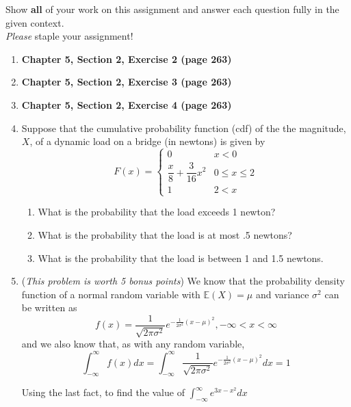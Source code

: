 \documentclass[11pt]{article}
\newcommand{\ben}{\begin{enumerate}}
\newcommand{\een}{\end{enumerate}}
\begin{document}
\pagestyle{fancy} 

Show \textbf{all} of your work on this assignment and answer each question fully in the given context. \\

\emph{Please} staple your assignment! \\

\ben


\item \textbf{Chapter 5, Section 2, Exercise 2 (page 263)}

\item \textbf{Chapter 5, Section 2, Exercise 3 (page 263)}

\item \textbf{Chapter 5, Section 2, Exercise 4 (page 263)}

 
\item Suppose that the cumulative probability function (cdf)
of the the magnitude, $X$, of a dynamic load on a bridge (in newtons) is given by
$$
F(x) = \begin{cases}
     0 & x < 0 \\
     \dfrac{x}{8} + \dfrac{3}{16}x^2 & 0 \leq x \leq 2\\
     1 & 2 < x
\end{cases}
$$
\ben
\item What is the probability that the load exceeds 1 newton?

\item What is the probability that the load is at most .5 newtons?

\item What is the probability that the load is between 1 and 1.5 newtons.
\een 

 \item (\textit{This problem is worth 5 bonus points})
    We know that the probability density function of a normal random variable with $\mathbb{E}(X) = \mu$ and variance $\sigma^2$ can be written as
    $$
    f(x) = \frac{1}{\sqrt{2 \pi \sigma^2}} e^{-\frac{1}{2 \sigma^2 } (x - \mu)^2}, -\infty < x < \infty
    $$
    and we also know that, as with any random variable, 
    $$
    \int_{-\infty}^{\infty} f(x) dx  = \int_{-\infty}^{\infty} \frac{1}{\sqrt{2 \pi \sigma^2}} e^{-\frac{1}{2 \sigma^2 } (x - \mu)^2} dx  = 1
    $$

    Using the last fact, to find the value of $ \int_{-\infty}^{\infty} e^{3x -x^2} dx $
\een
\end{document}
